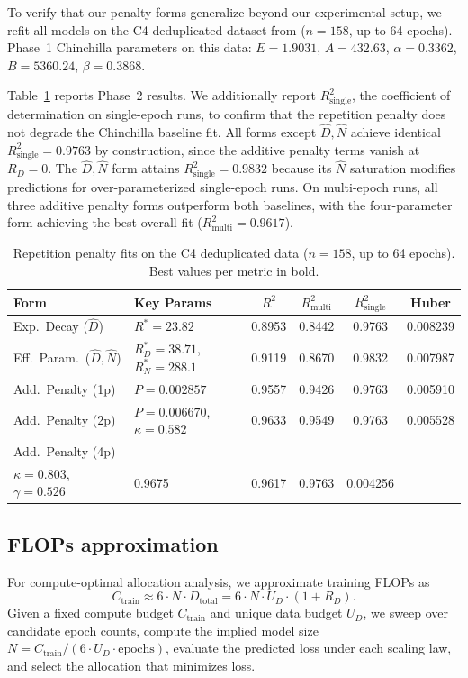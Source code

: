To verify that our penalty forms generalize beyond our experimental setup, we refit all models on the C4 deduplicated dataset from \citep{muennighoff2023scaling} ($n = 158$, up to 64 epochs).
Phase~1 Chinchilla parameters on this data: $E = 1.9031$, $A = 432.63$, $\alpha = 0.3362$, $B = 5360.24$, $\beta = 0.3868$.

Table~\ref{tab:muennighoff_refit} reports Phase~2 results.
We additionally report $R^2_{\text{single}}$, the coefficient of determination on single-epoch runs, to confirm that the repetition penalty does not degrade the Chinchilla baseline fit.
All forms except $\widehat{D}, \widehat{N}$ achieve identical $R^2_{\text{single}} = 0.9763$ by construction, since the additive penalty terms vanish at $R_D = 0$. The $\widehat{D}, \widehat{N}$ form attains $R^2_{\text{single}} = 0.9832$ because its $\widehat{N}$ saturation modifies predictions for over-parameterized single-epoch runs.
On multi-epoch runs, all three additive penalty forms outperform both baselines, with the four-parameter form achieving the best overall fit ($R^2_{\text{multi}} = 0.9617$).

\begin{table}[t]
\centering
\caption{Repetition penalty fits on the \citet{muennighoff2023scaling} C4 deduplicated data ($n = 158$, up to 64 epochs). Best values per metric in bold.}
\label{tab:muennighoff_refit}
\small
\begin{tabular}{llcccc}
\toprule
Form & Key Params & $R^2$ & $R^2_{\text{multi}}$ & $R^2_{\text{single}}$ & Huber \\
\midrule
Exp.\ Decay ($\widehat{D}$) & $R^* = 23.82$ & 0.8953 & 0.8442 & 0.9763 & 0.008239 \\
Eff.\ Param.\ ($\widehat{D}, \widehat{N}$) & $R^*_D = 38.71$, $R^*_N = 288.1$ & 0.9119 & 0.8670 & 0.9832 & 0.007987 \\
\midrule
Add.\ Penalty (1p) & $P = 0.002857$ & 0.9557 & 0.9426 & 0.9763 & 0.005910 \\
Add.\ Penalty (2p) & $P = 0.006670$, $\kappa = 0.582$ & 0.9633 & 0.9549 & 0.9763 & 0.005528 \\
Add.\ Penalty (4p) & \makecell[l]{$P = 2.48 \times 10^{-6}$, $\delta = 1.040$, \\ $\kappa = 0.803$, $\gamma = 0.526$} & {0.9675} & {0.9617} & {0.9763} & {0.004256} \\
\bottomrule
\end{tabular}
\end{table}

\subsection{FLOPs approximation}

For compute-optimal allocation analysis, we approximate training FLOPs as
\begin{equation}
    C_{\text{train}} \approx 6 \cdot N \cdot D_{\text{total}} = 6 \cdot N \cdot U_D \cdot (1 + R_D).
\end{equation}
Given a fixed compute budget $C_{\text{train}}$ and unique data budget $U_D$, we sweep over candidate epoch counts, compute the implied model size $N = C_{\text{train}} / (6 \cdot U_D \cdot \text{epochs})$, evaluate the predicted loss under each scaling law, and select the allocation that minimizes loss.

